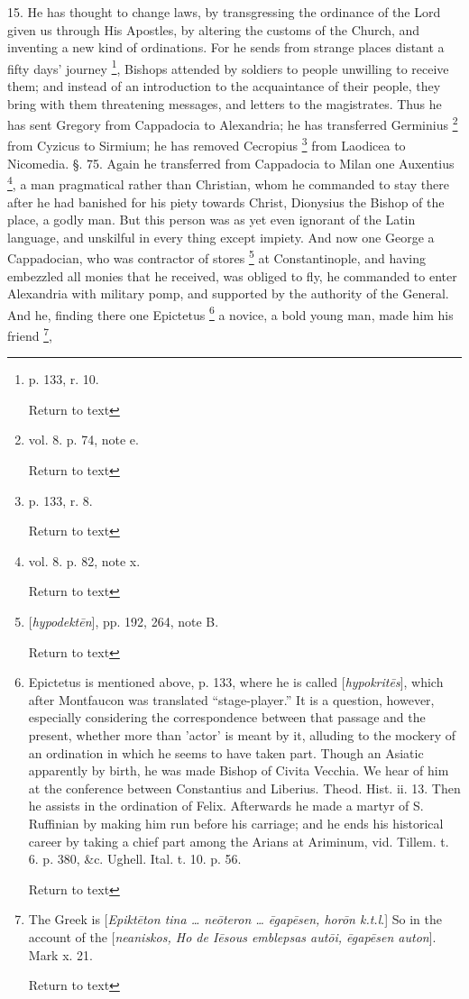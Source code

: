 15. He has thought to change laws, by
transgressing the ordinance of the Lord given us through His Apostles,
by altering the customs of the Church, and inventing a new kind of
ordinations. For he sends from strange places distant a fifty days'
journey \footnote{p. 133, r. 10.

Return to text}, Bishops attended by soldiers to people unwilling to
receive them; and instead of an introduction to the acquaintance of
their people, they bring with them threatening messages, and letters
to the magistrates. Thus he has sent Gregory from Cappadocia to
Alexandria; he has transferred Germinius \footnote{vol. 8. p. 74, note e.

Return to text} from Cyzicus to
Sirmium; he has removed Cecropius \footnote{p. 133, r. 8.

Return to text} from Laodicea to
Nicomedia. §. 75. Again he transferred from Cappadocia to Milan one
Auxentius \footnote{vol. 8. p. 82, note x.

Return to text}, a man pragmatical rather than Christian, whom he
commanded to stay there after he had banished for his piety towards
Christ, Dionysius the Bishop of the place, a godly man. But this
person was as yet even ignorant of the Latin language, and unskilful
in every thing except impiety. And now one George a Cappadocian, who
was contractor of stores \footnote{[\emph{hypodekt\={e}n}], pp. 192, 264,
note B.

Return to text} at Constantinople, and having
embezzled all monies that he received, was obliged to fly, he
commanded to enter Alexandria with military pomp, and supported by the
authority of the General. And he, finding there one Epictetus \footnote{Epictetus is mentioned above, p. 133, where he
is called [\emph{hypokrit\={e}s}], which after Montfaucon was
translated ``stage-player.'' It is a question, however, especially
considering the correspondence between that passage and the present,
whether more than 'actor' is meant by it, alluding to the mockery of
an ordination in which he seems to have taken part. Though an Asiatic
apparently by birth, he was made Bishop of Civita Vecchia. We hear of
him at the conference between Constantius and Liberius. Theod. Hist.
ii. 13. Then he assists in the ordination of Felix. Afterwards he made
a martyr of S. Ruffinian by making him run before his carriage; and he
ends his historical career by taking a chief part among the Arians at
Ariminum, vid. Tillem. t. 6. p. 380, \&c. Ughell. Ital. t. 10. p.
56.

Return to text}
a novice, a bold young man, made him his friend \footnote{The Greek is [\emph{Epikt\={e}ton tina … ne\={o}teron
… \={e}gap\={e}sen, hor\={o}n k.t.l}.] So in the account
of the [\emph{neaniskos, Ho de I\={e}sous emblepsas aut\={o}i, \={e}gap\={e}sen
auton}]. Mark x. 21.

Return to text},
